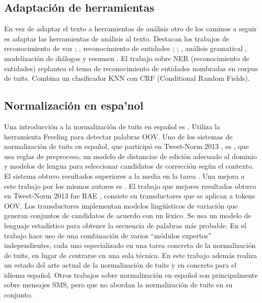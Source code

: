 \documentclass[spanish,12pt, a4paper,twoside]{paper}
\begin{document}
\subsection{Adaptación de herramientas}\label{adaptaciondeherramientas}
En vez de adaptar el texto a herramientas de análisis otro de los caminos a seguir es adaptar las herramientas de análisis al texto. Destacan los trabajos de reconocimiento de voz \cite{gimpel:2011}; \cite{owoputi:2013}, reconocimiento de entidades \cite{finin:2010}; \cite{ritter:2011}; \cite{liu:2011}, análisis gramatical \cite{foster:2011}, modelización de diálogos \cite{ritter:2010} y resumen \cite{sharifi:2010}. El trabajo \cite{liu:2011} sobre NER (reconocimiento de entidades) replantea el tema de reconocimiento de entidades nombradas en corpus de tuits. Combina un clasificador KNN con CRF (Conditional Random Fields).
\subsection{Normalización en espa'nol}\label{normalzacionenespanol}
Una introducción a la normalización de tuits en español es \cite{alegria:2013}\cite{alegria:2015}. Utiliza la herramienta Freeling \cite{freeling} para detectar palabras OOV. Uno de los sistemas de normalización de tuits en español, que participó en Tweet-Norm 2013 \cite{alegria:2013}, es \cite{ruizcuadros:2013}\cite{vicomtech}, que usa reglas de preproceso, un modelo de distancias de edición adecuado al dominio y modelos de lengua para seleccionar candidatos de corrección según el contexto. El sistema obtuvo resultados superiores a la media en la tarea \cite{alegria:2013}\cite{tweetnorm}. Una mejora a este trabajo por los mismos autores es \cite{ruizcuadros:2014}. El trabajo que mejores resultados obtuvo en Tweet-Norm 2013 fue RAE \cite{porta:2013}, consiste en transductores que se aplican a tokens OOV. Los transductores implementan modelos lingüísticos de variación que generan conjuntos de candidatos de acuerdo con un léxico. Se usa un modelo de lenguaje estadístico para obtener la secuencia de palabras más probable. En el trabajo \cite{cotelocruz:2015} hace uso de una combinación de varios “módulos expertos” independientes, cada uno especializado en una tarea concreta de la normalización de tuits, en lugar de centrarse en una sola técnica. En este trabajo además realiza un estado del arte actual de la normalización de tuits y en concreto para el idioma español. Otros trabajos sobre normalización en español son \cite{gomezhidalgo:2013} \cite{mosquera:2012} \cite{oliva:2011} principalmente sobre mensajes SMS, pero que no abordan la normalización de tuits en su conjunto.
\end{document}

